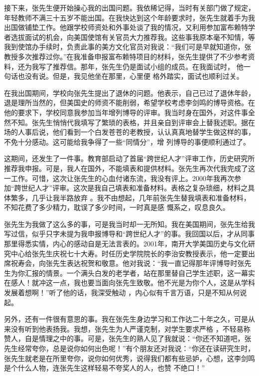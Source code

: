 \documentclass{article}
\begin{document}
接下来，张先生便开始操心我的出国问题。我依稀记得，当时有关部门做了规定，年轻教师不满三十五岁不能出国。在我快达到这个年龄要求时，张先生就着手为我出国做铺垫工作。他跟学校师资处和外事处谈了我的情况，又利用参加富布赖特学者选拔面试的机会，向美国使馆有关官员大力推荐我。这些事我原本毫不知情，等我到使馆办手续时，负责此事的美方文化官员对我说：“我们可是早就知道你，张教授多次推荐过你。”在我准备申报富布赖特项目的材料，张先生提供了不少参考资料，还为我写了推荐信。那年，张先生仍是面试小组的成员。在我面试时，
\newpage
他一句话也没有说。但是，我见他坐在那里，心里便
格外踏实，面试也顺利过关。 

在我出国期间，学校向张先生提出了退休的问题。他表示，自己已过了退休年龄，退是理所当然的，但美国史的师资不能削弱，希望学校考虑李剑鸣的博导资格。在他的要求下，学校同意我参加当年增列博导的评审。我当时身在国外，对这件事全然不知。张先生悄悄代我填写了繁琐的表格，并且亲自到评审会上替我述职。据在场的人事后说，他们看到一个白发苍苍的老教授，认认真真地替学生做这样的事，不免十分感动。这可能给我争得了一些“同情分”，增
列博导的事便顺利通过了。 

这期间，还发生了一件事。教育部启动了首届“跨世纪人才”评审工作，历史研究所推荐我申报。可是，我人在国外，不能填表和提供材料。张先生再次代我完成了这一工作。可惜，这次让张先生的心血付诸东流，我没有评上。2000年我再次参加“跨世纪人才”评审。这次是我自己填表和准备材料。表格之复杂琐细，材料之具体繁多，几乎让我半路放弃
\newpage
。我不由想起，几年前张先生替我填表和准备材料，不知花费了多少精力，耽误了多少时间，一时真是感
慨系之，叹息良久。 

张先生为我做了这么多的事，可是我当时却一无所知。我在美国期间，张先生给我写过信，似乎只字未提为我申报博导和“跨世纪人才”的事。我回国以后，才从同事那里得悉实情，内心的感动自是无法言表的。2001年，南开大学美国历史与文化研究中心给张先生庆祝七十大寿。时任历史学院院长的李治安教授表示，他一定要出席祝寿会，向张先生表达祝贺和敬意。他对我说：“我一直记得那年评博导时张先生为你汇报的情景。一个满头白发的老学者，站在那里替自己学生述职，这一幕实在感人！就冲这一点，我也要当面向张先生致敬。他不光是为你个人，这是从学科发展着想啊！”听了他的话，我深受触动
，内心似有千言万语，只是不知从何说起。 

另外，还有一件很有意思的事。我在张先生身边学习和工作达二十年之久，可是从来没有听到他表扬我。我想，张先生为人严谨克制，对学生要求严格
\newpage
，不轻易称赞人，自是情理之中的事。可是，张先生的熟人见了我就说：“你还不知道吧，张先生经常夸你，总是说你如何出色呢！”有个朋友还对我说：“你还在读研究生时，张先生就老是在所里夸你，说你如何优秀，说得我们都有些忌妒，心想，这李剑鸣是个什么人物，连张先生这样轻易不夸奖人的人，也赞
不绝口！”  
\end{document}
